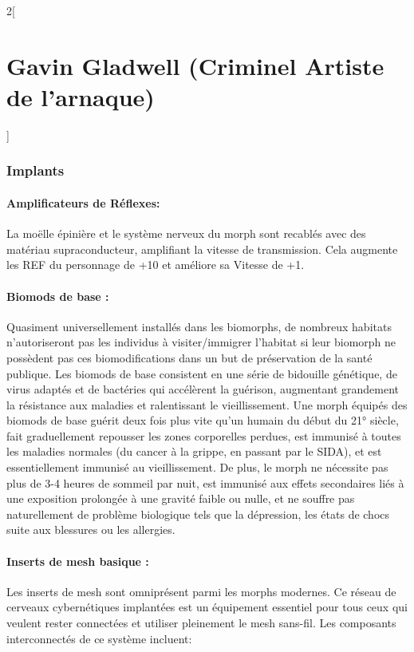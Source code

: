 \documentclass[a4paper,9pt]{article}
\begin{document}
\begin{multicols}{2}[\section*{Gavin Gladwell (Criminel Artiste de l'arnaque)}]
\subsubsection*{Implants}

\paragraph{Amplificateurs de Réflexes:} La moëlle épinière et le système nerveux
du morph sont recablés avec des matériau supraconducteur, amplifiant la
vitesse de transmission. Cela augmente les REF du personnage de +10 et améliore
sa Vitesse de +1.

\paragraph{Biomods de base :} 
Quasiment universellement  installés dans les biomorphs, de nombreux habitats
n'autoriseront pas les individus à visiter/immigrer l'habitat si leur biomorph
ne possèdent pas ces biomodifications dans un but de préservation de la santé
publique. Les biomods de base consistent en une série de bidouille génétique,
de virus adaptés et de bactéries qui accélèrent la guérison, augmentant
grandement la résistance aux maladies et ralentissant le vieillissement. Une
morph équipés des biomods de base guérit deux fois plus vite qu'un humain du
début du 21° siècle, fait graduellement repousser les zones corporelles
perdues, est immunisé à toutes les maladies normales (du cancer à la grippe, en
passant par le SIDA), et est essentiellement immunisé au vieillissement. De
plus, le morph ne nécessite pas plus de 3-4 heures de sommeil par nuit, est
immunisé aux effets secondaires liés à une exposition prolongée à une gravité
faible ou nulle, et ne souffre pas naturellement de problème biologique tels
que la dépression, les états de chocs suite aux blessures ou les allergies.

\paragraph{Inserts de mesh basique :} 
Les inserts de mesh sont omniprésent parmi les morphs modernes. Ce réseau de
cerveaux cybernétiques implantées est un équipement essentiel pour tous ceux
qui veulent rester connectées et utiliser pleinement le mesh sans-fil. Les
composants interconnectés de ce système incluent: 


\end{multicols}
\end{document}
